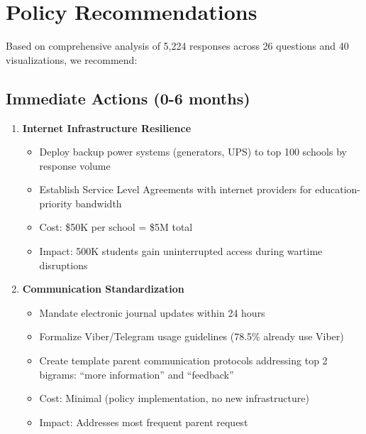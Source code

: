\documentclass[11pt,a4paper]{article}
\begin{document}
\newpage

\section{Policy Recommendations}

Based on comprehensive analysis of 5,224 responses across 26 questions and 40 visualizations, we recommend:

\subsection{Immediate Actions (0-6 months)}

\begin{enumerate}
    \item \textbf{Internet Infrastructure Resilience}
    \begin{itemize}
        \item Deploy backup power systems (generators, UPS) to top 100 schools by response volume
        \item Establish Service Level Agreements with internet providers for education-priority bandwidth
        \item Cost: \$50K per school = \$5M total
        \item Impact: 500K students gain uninterrupted access during wartime disruptions
    \end{itemize}

    \item \textbf{Communication Standardization}
    \begin{itemize}
        \item Mandate electronic journal updates within 24 hours
        \item Formalize Viber/Telegram usage guidelines (78.5\% already use Viber)
        \item Create template parent communication protocols addressing top 2 bigrams: ``more information'' and ``feedback''
        \item Cost: Minimal (policy implementation, no new infrastructure)
        \item Impact: Addresses most frequent parent request
    \end{itemize}


\end{enumerate}
\end{document}
